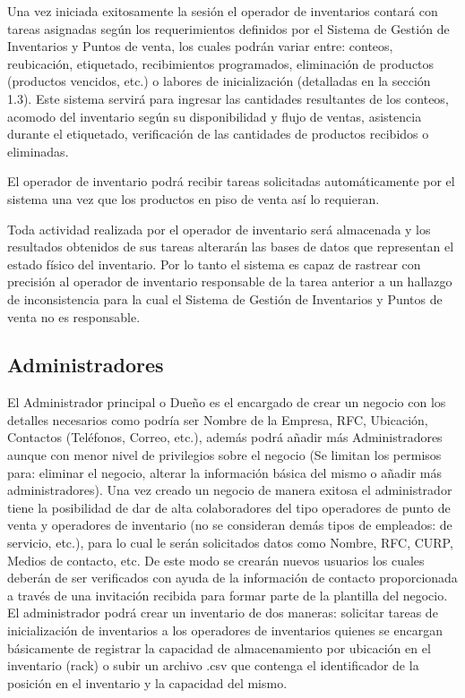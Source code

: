 \documentclass{article}
\begin{document}
Una vez iniciada exitosamente la sesión el operador de inventarios contará con tareas asignadas según los requerimientos definidos por el Sistema de Gestión de Inventarios y Puntos de venta, los cuales podrán variar entre: conteos, reubicación, etiquetado, recibimientos programados, eliminación de productos (productos vencidos, etc.) o labores de inicialización (detalladas en la sección 1.3). Este sistema servirá para ingresar las cantidades resultantes de los conteos, acomodo del inventario según su disponibilidad y flujo de ventas, asistencia durante el etiquetado, verificación de las cantidades de productos recibidos o eliminadas.

El operador de inventario podrá recibir tareas solicitadas automáticamente por el sistema una vez que los productos en piso de venta así lo requieran.

Toda actividad realizada por el operador de inventario será almacenada y los resultados obtenidos de sus tareas alterarán las bases de datos que representan el estado físico del inventario. Por lo tanto el sistema es capaz de rastrear con precisión al operador de inventario responsable de la tarea anterior a un hallazgo de inconsistencia para la cual el Sistema de Gestión de Inventarios y Puntos de venta no es responsable.

\subsection{Administradores}

El Administrador principal o Dueño es el encargado de crear un negocio con los detalles necesarios como podría ser Nombre de la Empresa, RFC, Ubicación, Contactos (Teléfonos, Correo, etc.), además podrá añadir más Administradores aunque con menor nivel de privilegios sobre el negocio (Se limitan los permisos para: eliminar el negocio, alterar la información básica del mismo o añadir más administradores).
Una vez creado un negocio de manera exitosa el administrador tiene la posibilidad de dar de alta colaboradores del tipo operadores de punto de venta y operadores de inventario (no se consideran demás tipos de empleados: de servicio, etc.), para lo cual le serán solicitados datos como Nombre, RFC, CURP, Medios de contacto, etc. De este modo se crearán nuevos usuarios los cuales deberán de ser verificados con ayuda de la información de contacto proporcionada a través de una invitación recibida para formar parte de la plantilla del negocio.
El administrador podrá crear un inventario de dos maneras: solicitar tareas de inicialización de inventarios a los operadores de inventarios quienes se encargan básicamente de registrar la capacidad de almacenamiento por ubicación en el inventario (rack) o subir un archivo .csv que contenga el identificador de la posición en el inventario y la capacidad del mismo.
\end{document}
